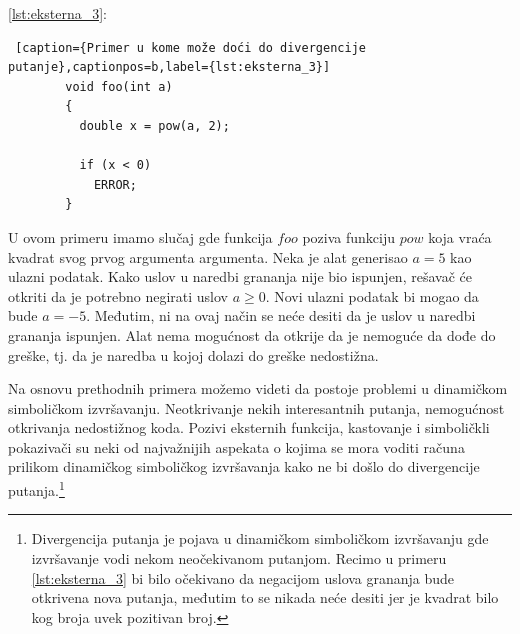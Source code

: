 \documentclass[12pt,oneside]{memoir}
\begin{document}
\ref{lst:eksterna_3}:
    \begin{lstlisting} [caption={Primer u kome može doći do divergencije putanje},captionpos=b,label={lst:eksterna_3}]
        void foo(int a)
        {
          double x = pow(a, 2);
          
          if (x < 0)
            ERROR;
        }
    \end{lstlisting}
\bigbreak

U ovom primeru imamo slučaj gde funkcija $foo$ poziva funkciju $pow$ koja vraća kvadrat svog prvog argumenta argumenta. Neka je alat generisao $a = 5$ kao ulazni podatak. Kako uslov u naredbi grananja nije bio ispunjen, rešavač će otkriti da je potrebno negirati uslov $a \geq 0$. Novi ulazni podatak bi mogao da bude $a = -5$. Međutim, ni na ovaj način se neće desiti da je uslov u naredbi grananja ispunjen. Alat nema mogućnost da otkrije da je nemoguće da dođe do greške, tj. da je naredba u kojoj dolazi do greške nedostižna. 

Na osnovu prethodnih primera možemo videti da postoje problemi u dinamičkom simboličkom izvršavanju. Neotkrivanje nekih interesantnih putanja, nemogućnost otkrivanja nedostižnog koda. Pozivi eksternih funkcija, kastovanje i simboličkli pokazivači su neki od najvažnijih aspekata o kojima se mora voditi računa prilikom dinamičkog simboličkog izvršavanja kako ne bi došlo do divergencije putanja.\footnote[1]{Divergencija putanja je pojava u dinamičkom simboličkom izvršavanju gde izvršavanje vodi nekom neočekivanom putanjom. Recimo u primeru \ref{lst:eksterna_3} bi bilo očekivano da negacijom uslova grananja bude otkrivena nova putanja, međutim to se nikada neće desiti jer je kvadrat bilo kog broja uvek pozitivan broj.}
\end{document}
